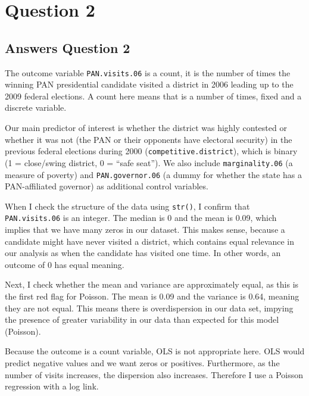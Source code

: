 \documentclass[12pt,letterpaper]{article}
\begin{document}
\newpage
\section*{Question 2}

\subsection{Answers Question 2}

\noindent The outcome variable \texttt{PAN.visits.06} is a count, it is the number of times the winning PAN presidential candidate visited a district in 2006 leading up to the 2009 federal elections. A count here means that is a number of times, fixed and a discrete variable. \newline

\noindent Our main predictor of interest is whether the district was highly contested or  whether it was not (the PAN or their opponents have electoral security) in the  previous federal elections during 2000 (\texttt{competitive.district}), which is binary (1 = close/swing district, 0 = ``safe seat''). We also include  \texttt{marginality.06} (a measure of poverty) and \texttt{PAN.governor.06}  (a dummy for whether the state has a PAN-affiliated governor) as additional  control variables.\newline

\noindent When I check the structure of the data using \texttt{str()}, I confirm that 
\texttt{PAN.visits.06} is an integer. The median is 0 and the mean is 0.09, which 
implies that we have many zeros in our dataset. This makes sense, because a 
candidate might have never visited a district, which contains equal relevance in our analysis as when the candidate has visited one time. In other words, an outcome of 0 has equal meaning.\newline

\noindent Next, I check whether the mean and variance are approximately equal, as this is the first red flag for Poisson. The mean is 0.09 and the variance is 0.64, meaning they are not equal. This means there is overdispersion in our data set, impying  the presence of greater variability in our data than expected for this model (Poisson).\newline

\noindent Because the outcome is a count variable, OLS is not appropriate here.  OLS would predict negative values and we want zeros or positives. Furthermore, as the number of visits increases, the dispersion also increases. Therefore I use a Poisson regression with a log link.\newline
\end{document}
